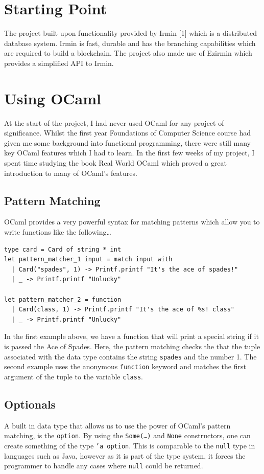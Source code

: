 \documentclass[12pt,a4paper,twoside,openright]{report}
\begin{document}
	\section{Starting Point}
		The project built upon functionality provided by Irmin [1] which is a distributed database system.  Irmin is fast, durable and has the branching capabilities which are required to build a blockchain.
		The project also made use of Ezirmin \cite{Ezirmin} which provides a simplified API to Irmin.

	\section{Using OCaml}
		At the start of the project, I had never used OCaml for any project of significance. 
		Whilst the first year Foundations of Computer Science course had given me some background into functional programming, there were still many key OCaml features which I had to learn.
		In the first few weeks of my project, I spent time studying the book Real World OCaml \cite{RealWorldOCaml} which proved a great introduction to many of OCaml's features.  

		\subsection*{Pattern Matching}
		OCaml provides a very powerful syntax for matching patterns which allow you to write functions like the following\ldots 
		\begin{lstlisting}
type card = Card of string * int
let pattern_matcher_1 input = match input with 
  | Card("spades", 1) -> Printf.printf "It's the ace of spades!"
  | _ -> Printf.printf "Unlucky"
  
let pattern_matcher_2 = function 
  | Card(class, 1) -> Printf.printf "It's the ace of %s! class"
  | _ -> Printf.printf "Unlucky"
		\end{lstlisting}
		In the first example above, we have a function that will print a special string if it is passed the Ace of Spades. 
		Here, the pattern matching checks the that the tuple associated with the data type contains the string \texttt{spades} and the number 1.
		The second example uses the anonymous \texttt{function} keyword and matches the first argument of the tuple to the variable \texttt{class}.
		\subsection*{Optionals}
		A built in data type that allows us to use the power of OCaml's pattern matching, is the \texttt{option}. 
		By using the \texttt{Some(\ldots)} and \texttt{None} constructors, one can create something of the type \texttt{'a option}. 
		This is comparable to the \texttt{null} type in languages such as Java, however as it is part of the type system, it forces the programmer to handle any cases where \texttt{null} could be returned.
\end{document}
